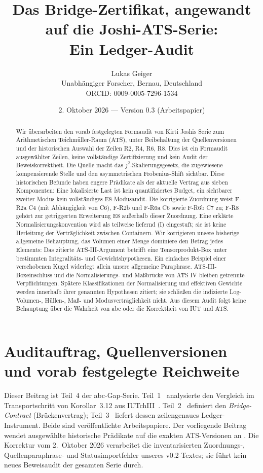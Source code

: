 \documentclass[11pt,a4paper]{article}
\title{Das Bridge-Zertifikat, angewandt auf die Joshi-ATS-Serie:\\Ein Ledger-Audit}
\author{Lukas Geiger\\\small Unabhängiger Forscher, Bernau, Deutschland\\\small ORCID: 0009-0005-7296-1534}
\date{2. Oktober 2026 --- Version 0.3 (Arbeitspapier)}
\begin{document}
\maketitle

\begin{abstract}
Wir überarbeiten den vorab festgelegten Formaudit von Kirti Joshis Serie
zum Arithmetischen Teichmüller-Raum (ATS), unter Beibehaltung der
Quellenversionen und der historischen Auswahl der Zeilen R2, R4, R6, R8.
Dies ist ein Formaudit ausgewählter Zeilen, keine vollständige
Zertifizierung und kein Audit der Beweiskorrektheit. Die Quelle macht das
$j^2$-Skalierungsgesetz, die zugewiesene kompensierende Stelle und den
asymmetrischen Frobenius-Shift sichtbar. Diese historischen Befunde haben
engere Prädikate als der aktuelle Vertrag aus sieben Komponenten: Eine
lokalisierte Last ist kein quantifiziertes Budget, ein sichtbarer zweiter
Modus kein vollständiges E8-Modusaudit. Die korrigierte Zuordnung weist
F-R2a C4 (mit Abhängigkeit von C6), F-R2b und F-R6a C6 sowie F-R6b C7 zu;
F-R8 gehört zur getriggerten Erweiterung E8 außerhalb dieser Zuordnung.
Eine erklärte Normalisierungskonvention wird als teilweise liefernd (I)
eingestuft; sie ist keine Herleitung der Verträglichkeit zwischen
Containern. Wir korrigieren unsere bisherige allgemeine Behauptung, das
Volumen einer Menge dominiere den Betrag jedes Elements: Das zitierte
ATS-III-Argument betrifft eine Tensorprodukt-Box unter bestimmten
Integralitäts- und Gewichtshypothesen. Ein einfaches Beispiel einer
verschobenen Kugel widerlegt allein unsere allgemeine Paraphrase.
ATS-III-Boxeinschluss und die Normalisierungs- und Maßbrücke von ATS IV
bleiben getrennte Verpflichtungen. Spätere Klassifikationen der
Normalisierung und effektiven Gewichte werden innerhalb ihrer genannten
Hypothesen zitiert; sie schließen die indizierte Log-Volumen-, Hüllen-,
Maß- und Modusverträglichkeit nicht. Aus diesem Audit folgt keine
Behauptung über die Wahrheit von abc oder die Korrektheit von IUT und ATS.
\end{abstract}

\clearpage
\tableofcontents
\clearpage

\section{Auditauftrag, Quellenversionen und vorab festgelegte Reichweite}\label{sec:mandate}

Dieser Beitrag ist Teil~4 der abc-Gap-Serie. Teil~1~\cite{part1}
analysierte den Vergleich im Transportschritt von Korollar~3.12
aus IUTchIII~\cite{mochizukiIUT}. Teil~2~\cite{part2} definiert den
\emph{Bridge-Contract} (Brückenvertrag); Teil~3~\cite{part3} liefert
dessen zeilengenaues Ledger-Instrument. Beide sind veröffentlichte
Arbeitspapiere. Der vorliegende Beitrag wendet ausgewählte historische
Prädikate auf die exakten ATS-Versionen an
\cite{joshiI,joshiII,joshiIIhalf,joshiIII,joshiIV}.
Die Korrektur vom 2.~Oktober 2026 verarbeitet die inventarisierten
Zuordnungs-, Quellenparaphrase- und Statusimportfehler unseres
v0.2-Textes; sie führt kein neues Beweisaudit der gesamten Serie durch.
\end{document}
